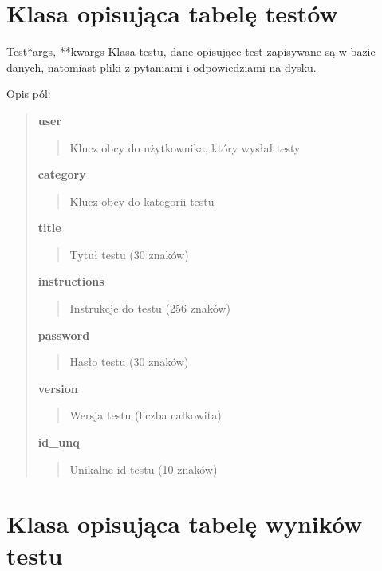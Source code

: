 \documentclass[letterpaper,10pt,polish]{manual}
\begin{document}
\section{Klasa opisująca tabelę testów}

\hypertarget{knut\_server.tests.models.Test}{}\begin{classdesc}{Test}{*args, **kwargs}
Klasa testu, dane opisujące test zapisywane są w bazie danych, natomiast pliki z pytaniami i odpowiedziami na dysku.

Opis pól:
\begin{quote}

\textbf{user}
\begin{quote}

Klucz obcy do użytkownika, który wysłał testy
\end{quote}

\textbf{category}
\begin{quote}

Klucz obcy do kategorii testu
\end{quote}

\textbf{title}
\begin{quote}

Tytuł testu (30 znaków)
\end{quote}

\textbf{instructions}
\begin{quote}

Instrukcje do testu (256 znaków)
\end{quote}

\textbf{password}
\begin{quote}

Hasło testu (30 znaków)
\end{quote}

\textbf{version}
\begin{quote}

Wersja testu (liczba całkowita)
\end{quote}

\textbf{id\_unq}
\begin{quote}

Unikalne id testu (10 znaków)
\end{quote}
\end{quote}
\end{classdesc}
\hypertarget{models-result}{}

\section{Klasa opisująca tabelę wyników testu}
\end{document}
